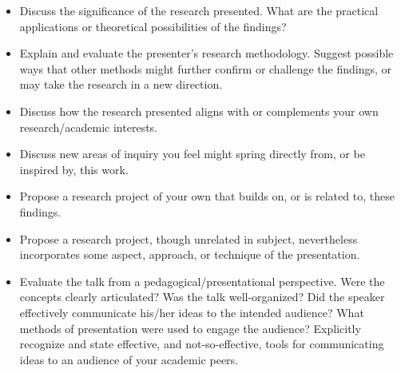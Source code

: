\documentclass{article}
\begin{document}
\begin{itemize}
    \item  Discuss the significance of the research presented. What are 
    the practical applications or theoretical possibilities of the 
    findings?

    \item Explain and evaluate the presenter’s research methodology. 
    Suggest possible ways that other methods might further confirm or 
    challenge the findings, or may take the research in a new direction.

    \item Discuss how the research presented aligns with or complements 
    your own research/academic interests.

    \item Discuss new areas of inquiry you feel might spring directly 
    from, or be inspired by, this work.

    \item Propose a research project of your own that builds on, or is
    related to, these findings.

    \item Propose a research project, though unrelated in subject, 
    nevertheless incorporates some aspect, approach, or technique of the presentation.

    \item Evaluate the talk from a pedagogical/presentational 
    perspective. Were the concepts clearly articulated? Was the talk well-organized? Did the speaker effectively communicate his/her ideas
    to the intended audience? What methods of presentation were used to 
    engage the audience? Explicitly recognize and state effective, and not-so-effective, tools for communicating ideas to an audience of 
    your academic peers.
\end{itemize}
\end{document}
